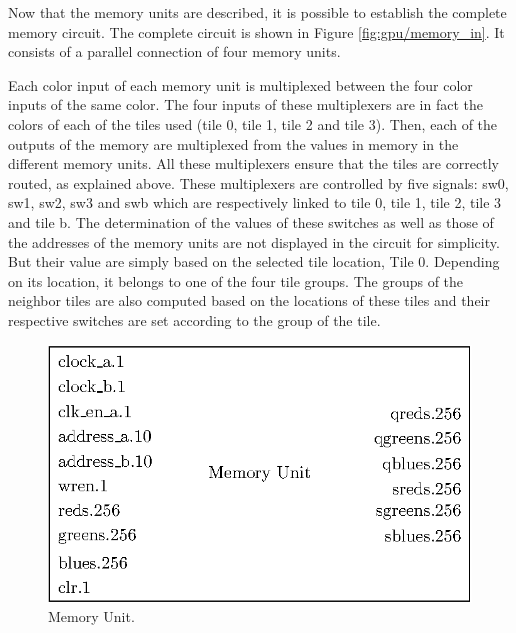 Now that the memory units are described, it is possible to establish the complete memory circuit.
The complete circuit is shown in Figure \ref{fig:gpu/memory_in}. It consists of a parallel 
connection of four memory units. 

Each color input of each memory unit is multiplexed between the four color inputs of the same color. 
The four inputs of these multiplexers are in fact the colors of each of the 
tiles used (tile 0, tile 1, tile 2 and tile 3). Then, each of the outputs of the memory are 
multiplexed from the values in memory in the different memory units. All these multiplexers ensure 
that the tiles are correctly routed, as explained above. These multiplexers are controlled by five 
signals: sw0, sw1, sw2, sw3 and swb which are respectively linked to tile 0, tile 1, tile 2, tile 3 
and tile b. The determination of the values of these switches as well as those of the addresses of 
the memory units are not displayed in the circuit for simplicity. But their
value are simply based on the selected tile location, Tile 0. Depending on its location, it belongs 
to one of the four tile groups. The groups of the neighbor tiles are also computed based on the 
locations of these tiles and their respective switches are set according to the group of the tile. 

\begin{figure}[H]
    \centering
    \includegraphics[scale=1.0]{Chapter4-GPU_CLKU/res/memory_unit}
    \caption{Memory Unit.}
    \label{fig:gpu/memory_unit}
\end{figure}

